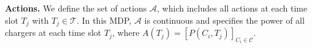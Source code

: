 
{\bf Actions.} We define the set of actions $\mathcal{A}$, which includes all actions at each time slot $T_j$ with $T_j \in \mathcal{T}$. In this MDP, $\mathcal{A}$ is continuous and specifies the power of all chargers at each time slot $T_j$, where $A(T_j) = [P(C_i, T_j)]_{C_i \in \mathcal{C}} $.
 

